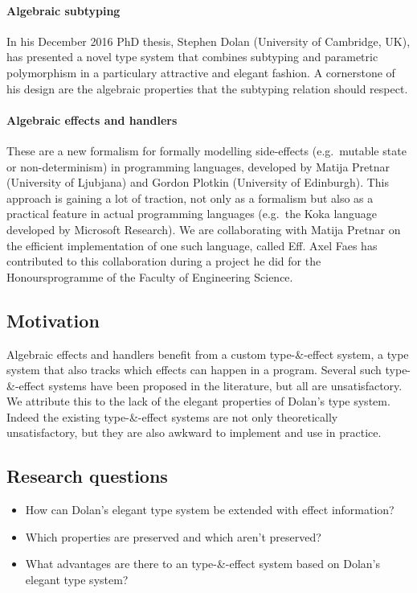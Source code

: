 \documentclass[sigplan,10pt]{acmart}\settopmatter{printfolios=true}
\begin{document}
\paragraph{Algebraic subtyping}

In his December 2016 PhD thesis, Stephen Dolan (University of Cambridge,
UK), has presented a novel type system that combines subtyping and
parametric polymorphism in a particulary attractive and elegant fashion.
A cornerstone of his design are the algebraic properties that the
subtyping relation should respect.

\paragraph{Algebraic effects and handlers}

These are a new formalism for formally modelling side-effects
(e.g.~mutable state or non-determinism) in programming languages,
developed by Matija Pretnar (University of Ljubjana) and Gordon Plotkin
(University of Edinburgh). This approach is gaining a lot of traction,
not only as a formalism but also as a practical feature in actual
programming languages (e.g.~the Koka language developed by Microsoft
Research). We are collaborating with Matija Pretnar on the efficient
implementation of one such language, called Eff. Axel Faes has
contributed to this collaboration during a project he did for the
Honoursprogramme of the Faculty of Engineering Science.

\subsection{Motivation}\label{motivation}

Algebraic effects and handlers benefit from a custom type-\&-effect
system, a type system that also tracks which effects can happen in a
program. Several such type-\&-effect systems have been proposed in the
literature, but all are unsatisfactory. We attribute this to the lack of
the elegant properties of Dolan's type system. Indeed the existing
type-\&-effect systems are not only theoretically unsatisfactory, but
they are also awkward to implement and use in practice.

\subsection{Research questions}\label{research-questions}

\begin{itemize}
\item How can Dolan's elegant type system be extended with effect information?
\item Which properties are preserved and which aren't preserved?
\item What advantages are there to an type-\&-effect system based on Dolan's elegant type system?
\end{itemize}
\end{document}
